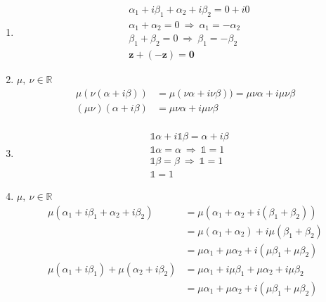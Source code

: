 \documentclass[a4paper, 10pt, ]{article}
\begin{document}
\begin{example}
\begin{enumerate}
        \item
        \begin{align*}
            &\alpha_1 + i \beta_1 + \alpha_2 + i\beta_2 = 0 + i0 \\
            &\alpha_1 + \alpha_2 = 0 \ \Longrightarrow \ \alpha_1 = -\alpha_2 \\
            &\beta_1 + \beta_2 = 0 \ \Longrightarrow \ \beta_1 = -\beta_2 \\
            & \bm{z} + (-\bm{z}) = \bm{0} 
        \end{align*}

        \item $\mu, \ \nu \in \mathbb{R}$
        \begin{align*}
            \mu (\nu (\alpha + i \beta)) &= \mu (\nu \alpha + i \nu \beta)) = \mu \nu \alpha + i \mu \nu \beta \\
            (\mu \nu) (\alpha + i \beta) &= \mu \nu \alpha + i \mu \nu \beta \\
        \end{align*}

        \item
        \begin{align*}
            &\mathbb{1} \alpha + i \mathbb{1} \beta = \alpha + i \beta \\
            &\mathbb{1} \alpha = \alpha \ \Longrightarrow \ \mathbb{1} = 1 \\
            &\mathbb{1} \beta = \beta \ \Longrightarrow \ \mathbb{1} = 1 \\
            &\mathbb{1} = 1 
        \end{align*}

        \item $\mu, \ \nu \in \mathbb{R}$
        \begin{align*}
            \mu (\alpha_1 + i \beta_1 + \alpha_2 + i\beta_2) &= 
            \mu (\alpha_1 + \alpha_2 + i (\beta_1 + \beta_2)) \\ &= 
            \mu(\alpha_1 + \alpha_2) + i \mu (\beta_1 + \beta_2) \\ & = 
            \mu \alpha_1 + \mu \alpha_2 + i (\mu \beta_1 + \mu \beta_2) \\ 
            \mu (\alpha_1 + i \beta_1) + \mu (\alpha_2 + i \beta_2) &= 
            \mu \alpha_1 + i \mu \beta_1 + \mu \alpha_2 + i \mu \beta_2 \\ &=
            \mu \alpha_1 + \mu \alpha_2 + i (\mu \beta_1 + \mu \beta_2)  
        \end{align*}


\end{enumerate}
\end{example}
\end{document}
